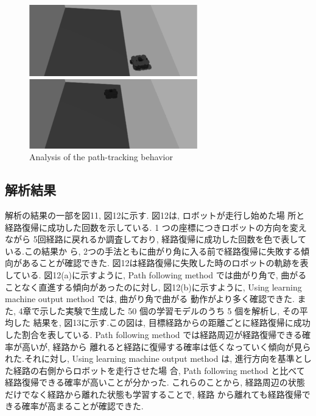 \documentclass{jarticle}
\begin{document}
\begin{figure}[htbp]
  \begin{minipage}[t]{0.5\linewidth}
    \centering
    \includegraphics[keepaspectratio, scale=0.3]{figs/init4.png}
  \end{minipage}
  \begin{minipage}[t]{0.5\linewidth}
    \centering
    \includegraphics[keepaspectratio, scale=0.31]{figs/return3.png}
  \end{minipage}\vspace*{4mm}
  \caption{Analysis of the path-tracking behavior}
\end{figure}


\subsection{解析結果}
解析の結果の一部を図11, 図12に示す. 図12は, ロボットが走行し始めた場
所と経路復帰に成功した回数を示している. 1 つの座標につきロボットの方向を変えながら
5回経路に戻れるか調査しており, 経路復帰に成功した回数を色で表している.この結果か
ら, 2つの手法ともに曲がり角に入る前で経路復帰に失敗する傾向があることが確認できた.
図12は経路復帰に失敗した時のロボットの軌跡を表している. 図12(a)に示すように,
Path following method では曲がり角で, 曲がることなく直進する傾向があったのに対し, 
図12(b)に示すように, Using learning machine output method では, 曲がり角で曲がる
動作がより多く確認できた.
また, 4章で示した実験で生成した 50 個の学習モデルのうち 5 個を解析し, その平均した
結果を, 図13に示す.この図は, 目標経路からの距離ごとに経路復帰に成功した割合を表している. 
Path following method では経路周辺が経路復帰できる確率が高いが, 経路から
離れると経路に復帰する確率は低くなっていく傾向が見られた.それに対し, Using learning
machine output method は, 進行方向を基準とした経路の右側からロボットを走行させた場
合, Path following method と比べて経路復帰できる確率が高いことが分かった.
これらのことから, 経路周辺の状態だけでなく経路から離れた状態も学習することで, 経路
から離れても経路復帰できる確率が高まることが確認できた.
\end{document}
